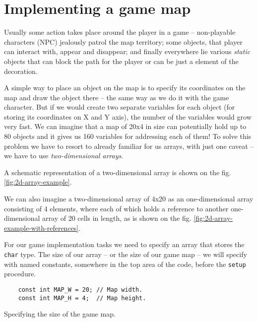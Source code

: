 \documentclass[../sparc.tex]{subfiles}
\begin{document}
\section{Implementing a game map}
\label{section:game-map}

Usually some action takes place around the player in a game -- non-playable
characters (NPC) jealously patrol the map territory; some objects, that player
can interact with, appear and disappear; and finally everywhere lie various
\emph{static} objects that can block the path for the player or can be just a
element of the decoration.

A simple way to place an object on the map is to specify its coordinates on the
map and draw the object there -- the same way as we do it with the game
character.  But if we would create two separate variables for each object (for
storing its coordinates on X and Y axis), the number of the variables would grow
very fast.  We can imagine that a map of 20x4 in size can potentially hold up to
80 objects and it gives us 160 variables for addressing each of them!  To solve
this problem we have to resort to already familiar for us arrays, with just one
caveat -- we have to use \emph{two-dimensional arrays}.

A schematic representation of a two-dimensional array is shown on the
fig. \ref{fig:2d-array-example}.


We can also imagine a two-dimensional array of 4x20 as an one-dimensional array
consisting of 4 elements, where each of which holds a reference to another
one-dimensional array of 20 cells in length, as is shown on the
fig. \ref{fig:2d-array-example-with-references}.


For our game implementation tasks we need to specify an array that stores the
\texttt{char} type.  The size of our array -- or the size of our game
map -- we will specify with named constants, somewhere in the top area of the
code, before the \texttt{setup} procedure.

\begin{listing}[H]
  \begin{verbatim}
    const int MAP_W = 20; // Map width.
    const int MAP_H = 4;  // Map height.
  \end{verbatim}
  \caption{Specifying the size of the game map.}
  \label{listing:game-dev-map-size}
\end{listing}
\end{document}
